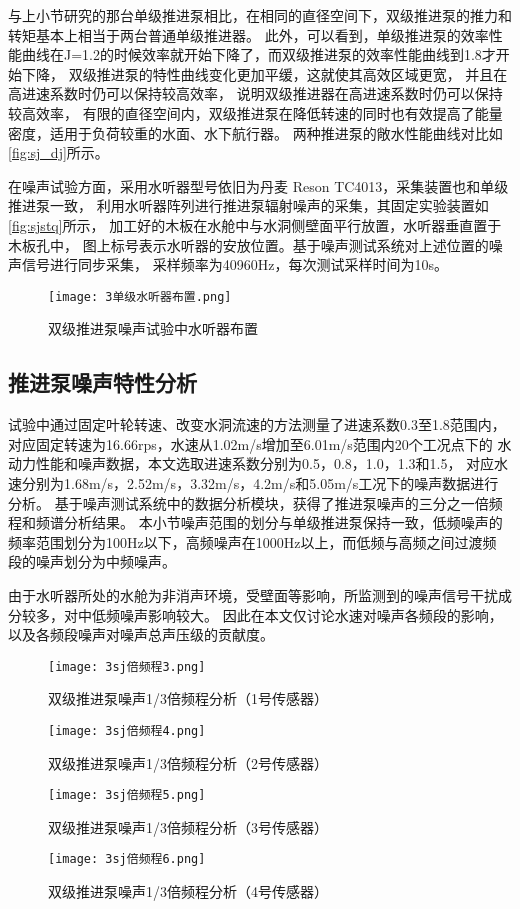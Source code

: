 与上小节研究的那台单级推进泵相比，在相同的直径空间下，双级推进泵的推力和转矩基本上相当于两台普通单级推进器。
此外，可以看到，单级推进泵的效率性能曲线在J=1.2的时候效率就开始下降了，而双级推进泵的效率性能曲线到1.8才开始下降，
双级推进泵的特性曲线变化更加平缓，这就使其高效区域更宽，
并且在高进速系数时仍可以保持较高效率，
说明双级推进器在高进速系数时仍可以保持较高效率，
有限的直径空间内，双级推进泵在降低转速的同时也有效提高了能量密度，适用于负荷较重的水面、水下航行器。
两种推进泵的敞水性能曲线对比如\autoref{fig:sj_dj}所示。

在噪声试验方面，采用水听器型号依旧为丹麦 Reson TC4013，采集装置也和单级推进泵一致，
利用水听器阵列进行推进泵辐射噪声的采集，其固定实验装置如\autoref{fig:sjstq}所示，
加工好的木板在水舱中与水洞侧壁面平行放置，水听器垂直置于木板孔中，
图上标号表示水听器的安放位置。基于噪声测试系统对上述位置的噪声信号进行同步采集，
采样频率为40960Hz，每次测试采样时间为10s。
\begin{figure}[htbp]
    \centering
    \texttt{[image: 3单级水听器布置.png]}
    \caption{\label{fig:sjstq}双级推进泵噪声试验中水听器布置}
\end{figure}
\subsection{推进泵噪声特性分析}
试验中通过固定叶轮转速、改变水洞流速的方法测量了进速系数0.3至1.8范围内，
对应固定转速为16.66rps，水速从1.02m/s增加至6.01m/s范围内20个工况点下的
水动力性能和噪声数据，本文选取进速系数分别为0.5，0.8，1.0，1.3和1.5，
对应水速分别为1.68m/s，2.52m/s，3.32m/s，4.2m/s和5.05m/s工况下的噪声数据进行分析。
基于噪声测试系统中的数据分析模块，获得了推进泵噪声的三分之一倍频程和频谱分析结果。
本小节噪声范围的划分与单级推进泵保持一致，低频噪声的频率范围划分为100Hz以下，高频噪声在1000Hz以上，而低频与高频之间过渡频
段的噪声划分为中频噪声。

由于水听器所处的水舱为非消声环境，受壁面等影响，所监测到的噪声信号干扰成分较多，对中低频噪声影响较大。
因此在本文仅讨论水速对噪声各频段的影响，以及各频段噪声对噪声总声压级的贡献度。
\begin{figure}[htbp]
    \centering
    \texttt{[image: 3sj倍频程3.png]}
    \caption{\label{fig:sjotc1}双级推进泵噪声1/3倍频程分析（1号传感器）}
\end{figure}
\begin{figure}[htbp]
    \centering
    \texttt{[image: 3sj倍频程4.png]}
    \caption{\label{fig:sjotc2}双级推进泵噪声1/3倍频程分析（2号传感器）}
\end{figure}
\begin{figure}[htbp]
    \centering
    \texttt{[image: 3sj倍频程5.png]}
    \caption{\label{fig:sjotc3}双级推进泵噪声1/3倍频程分析（3号传感器）}
\end{figure}
\begin{figure}[htbp]
    \centering
    \texttt{[image: 3sj倍频程6.png]}
    \caption{\label{fig:sjotc4}双级推进泵噪声1/3倍频程分析（4号传感器）}
\end{figure}

